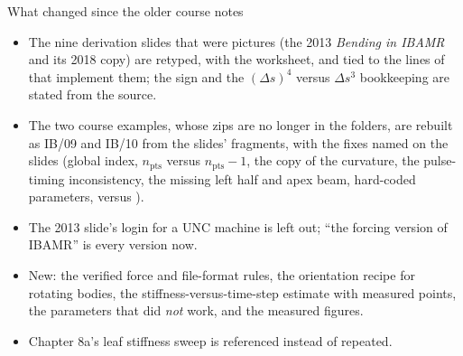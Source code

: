 \documentclass[aspectratio=169,11pt]{beamer}
\begin{document}
\begin{frame}{What changed since the older course notes}
\label{fr:changed}
\footnotesize
\begin{itemize}
  \item The nine derivation slides that were pictures (the 2013 \emph{Bending in IBAMR} and its 2018 copy) are retyped, with the worksheet, and tied to the lines of  that implement them; the sign and the $(\Delta s)^4$ versus $\Delta s^3$ bookkeeping are stated from the source.
  \item The two course examples, whose zips are no longer in the folders, are rebuilt as IB/09 and IB/10 from the slides' fragments, with the fixes named on the slides (global index, $n_{\mathrm{pts}}$ versus $n_{\mathrm{pts}} - 1$, the copy of the curvature, the pulse-timing inconsistency, the missing left half and apex beam, hard-coded parameters,  versus ).
  \item The 2013 slide's login for a UNC machine is left out; ``the forcing version of IBAMR'' is every version now.
  \item New: the verified force and file-format rules, the orientation recipe for rotating bodies, the stiffness-versus-time-step estimate with measured points, the parameters that did \emph{not} work, and the measured figures.
  \item Chapter 8a's leaf stiffness sweep is referenced instead of repeated.
\end{itemize}
\end{frame}
\end{document}
